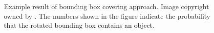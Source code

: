 \begin{figure}[!h]
	\centering
    \caption[Example result of bounding box covering approach]{Example result of bounding box covering approach. Image copyright owned by \cite{msnadine}. The numbers shown in the figure indicate the probability that the rotated bounding box contains an object.}
    \label{fig:rotbbox}
\end{figure}